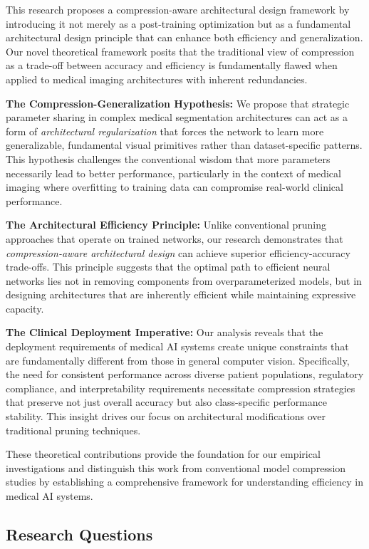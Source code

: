 \documentclass[12pt,a4paper]{article}
\begin{document}
This research proposes a compression-aware architectural design framework by introducing it not merely as a post-training optimization but as a fundamental architectural design principle that can enhance both efficiency and generalization. Our novel theoretical framework posits that the traditional view of compression as a trade-off between accuracy and efficiency is fundamentally flawed when applied to medical imaging architectures with inherent redundancies.

\textbf{The Compression-Generalization Hypothesis:} We propose that strategic parameter sharing in complex medical segmentation architectures can act as a form of \textit{architectural regularization} that forces the network to learn more generalizable, fundamental visual primitives rather than dataset-specific patterns. This hypothesis challenges the conventional wisdom that more parameters necessarily lead to better performance, particularly in the context of medical imaging where overfitting to training data can compromise real-world clinical performance.

\textbf{The Architectural Efficiency Principle:} Unlike conventional pruning approaches that operate on trained networks, our research demonstrates that \textit{compression-aware architectural design} can achieve superior efficiency-accuracy trade-offs. This principle suggests that the optimal path to efficient neural networks lies not in removing components from overparameterized models, but in designing architectures that are inherently efficient while maintaining expressive capacity.

\textbf{The Clinical Deployment Imperative:} Our analysis reveals that the deployment requirements of medical AI systems create unique constraints that are fundamentally different from those in general computer vision. Specifically, the need for consistent performance across diverse patient populations, regulatory compliance, and interpretability requirements necessitate compression strategies that preserve not just overall accuracy but also class-specific performance stability. This insight drives our focus on architectural modifications over traditional pruning techniques.

These theoretical contributions provide the foundation for our empirical investigations and distinguish this work from conventional model compression studies by establishing a comprehensive framework for understanding efficiency in medical AI systems.

\subsection{Research Questions}
\label{sec:research_questions}
\end{document}
